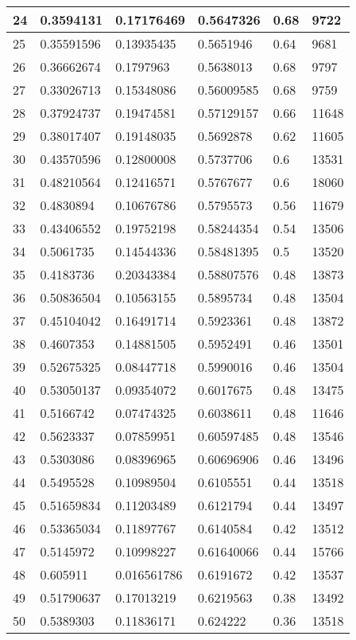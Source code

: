 \begin{longtable}{|l|l|l|l|l|l|}
24 & 0.3594131 & 0.17176469 & 0.5647326 & 0.68 & 9722 \\ \hline 
25 & 0.35591596 & 0.13935435 & 0.5651946 & 0.64 & 9681 \\ \hline 
26 & 0.36662674 & 0.1797963 & 0.5638013 & 0.68 & 9797 \\ \hline 
27 & 0.33026713 & 0.15348086 & 0.56009585 & 0.68 & 9759 \\ \hline 
28 & 0.37924737 & 0.19474581 & 0.57129157 & 0.66 & 11648 \\ \hline 
29 & 0.38017407 & 0.19148035 & 0.5692878 & 0.62 & 11605 \\ \hline 
30 & 0.43570596 & 0.12800008 & 0.5737706 & 0.6 & 13531 \\ \hline 
31 & 0.48210564 & 0.12416571 & 0.5767677 & 0.6 & 18060 \\ \hline 
32 & 0.4830894 & 0.10676786 & 0.5795573 & 0.56 & 11679 \\ \hline 
33 & 0.43406552 & 0.19752198 & 0.58244354 & 0.54 & 13506 \\ \hline 
34 & 0.5061735 & 0.14544336 & 0.58481395 & 0.5 & 13520 \\ \hline 
35 & 0.4183736 & 0.20343384 & 0.58807576 & 0.48 & 13873 \\ \hline 
36 & 0.50836504 & 0.10563155 & 0.5895734 & 0.48 & 13504 \\ \hline 
37 & 0.45104042 & 0.16491714 & 0.5923361 & 0.48 & 13872 \\ \hline 
38 & 0.4607353 & 0.14881505 & 0.5952491 & 0.46 & 13501 \\ \hline 
39 & 0.52675325 & 0.08447718 & 0.5990016 & 0.46 & 13504 \\ \hline 
40 & 0.53050137 & 0.09354072 & 0.6017675 & 0.48 & 13475 \\ \hline 
41 & 0.5166742 & 0.07474325 & 0.6038611 & 0.48 & 11646 \\ \hline 
42 & 0.5623337 & 0.07859951 & 0.60597485 & 0.48 & 13546 \\ \hline 
43 & 0.5303086 & 0.08396965 & 0.60696906 & 0.46 & 13496 \\ \hline 
44 & 0.5495528 & 0.10989504 & 0.6105551 & 0.44 & 13518 \\ \hline 
45 & 0.51659834 & 0.11203489 & 0.6121794 & 0.44 & 13497 \\ \hline 
46 & 0.53365034 & 0.11897767 & 0.6140584 & 0.42 & 13512 \\ \hline 
47 & 0.5145972 & 0.10998227 & 0.61640066 & 0.44 & 15766 \\ \hline 
48 & 0.605911 & 0.016561786 & 0.6191672 & 0.42 & 13537 \\ \hline 
49 & 0.51790637 & 0.17013219 & 0.6219563 & 0.38 & 13492 \\ \hline 
50 & 0.5389303 & 0.11836171 & 0.624222 & 0.36 & 13518 \\ \hline 
\end{longtable}